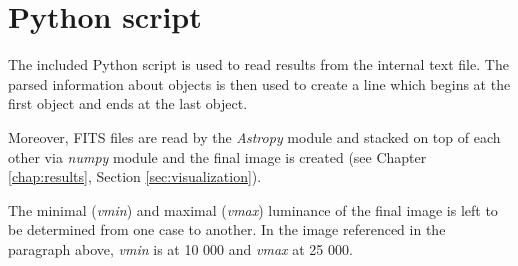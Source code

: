 \section{Python script}\label{sec:python_script}

	The included Python script is used to read results from the internal text file. The parsed information about objects is then used to create a line which begins at the first object and ends at the last object.
	
	Moreover, FITS files are read by the \emph{Astropy} module and stacked on top of each other via \emph{numpy} module and the final image is created (see Chapter \ref{chap:results}, Section \ref{sec:visualization}).
	
	The minimal (\emph{vmin}) and maximal (\emph{vmax}) luminance of the final image is left to be determined from one case to another. In the image referenced in the paragraph above, \emph{vmin} is at 10 000 and \emph{vmax} at 25 000.